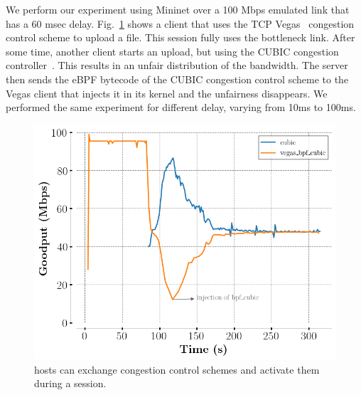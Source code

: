 We perform our experiment using Mininet  over a 100 Mbps emulated link that has a 60 msec delay.
Fig.~\ref{fig:vegasCubic} shows a client that uses the TCP
Vegas~\cite{10.1145/190314.190317} congestion control scheme to upload a file.
This \tcpls session fully uses the bottleneck link. After some time, another
client starts an upload, but using the CUBIC congestion
controller~\cite{rfc8312}. This results in an unfair distribution of the
bandwidth. The server then sends the eBPF bytecode of the CUBIC congestion
control scheme to the \tcp Vegas client that injects it in its kernel and the
unfairness disappears.  We performed the same experiment for different delay,
varying from 10ms to 100ms.

\begin{figure}[!t]
  \begin{center}
    \includegraphics[width=\columnwidth]{pretty_plotify/plots/vegas_cubic.png}
  \end{center}
  \caption{\tcpls hosts can exchange congestion control schemes and activate them during a \tcpls session.}
  \label{fig:vegasCubic}
\end{figure}
